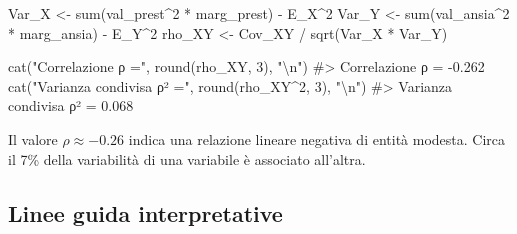 \documentclass[
  italian,
  letterpaper,
  a4paper,
  11pt,
  open=any]{scrbook}
\newenvironment{Shaded}{\begin{snugshade}}{\end{snugshade}}
\newcommand{\CommentTok}[1]{\textcolor[rgb]{0.37,0.37,0.37}{#1}}
\newcommand{\DecValTok}[1]{\textcolor[rgb]{0.68,0.00,0.00}{#1}}
\newcommand{\FunctionTok}[1]{\textcolor[rgb]{0.28,0.35,0.67}{#1}}
\newcommand{\NormalTok}[1]{\textcolor[rgb]{0.00,0.23,0.31}{#1}}
\newcommand{\OtherTok}[1]{\textcolor[rgb]{0.00,0.23,0.31}{#1}}
\newcommand{\SpecialCharTok}[1]{\textcolor[rgb]{0.37,0.37,0.37}{#1}}
\newcommand{\StringTok}[1]{\textcolor[rgb]{0.13,0.47,0.30}{#1}}
\theoremstyle{plain}
\theoremstyle{definition}
\theoremstyle{definition}
\theoremstyle{remark}
\begin{document}
\begin{tcolorbox}[enhanced jigsaw, arc=.35mm, bottomrule=.15mm, bottomtitle=1mm, breakable, colback=white, colbacktitle=quarto-callout-note-color!10!white, colframe=quarto-callout-note-color-frame, coltitle=black, left=2mm, leftrule=.75mm, opacityback=0, opacitybacktitle=0.6, rightrule=.15mm, title=\textcolor{quarto-callout-note-color}{\faInfo}\hspace{0.5em}{Esempio: correlazione ansia-prestazione}, titlerule=0mm, toprule=.15mm, toptitle=1mm]

\begin{Shaded}
\begin{Highlighting}[]
\NormalTok{Var\_X }\OtherTok{\textless{}{-}} \FunctionTok{sum}\NormalTok{(val\_prest}\SpecialCharTok{\^{}}\DecValTok{2} \SpecialCharTok{*}\NormalTok{ marg\_prest) }\SpecialCharTok{{-}}\NormalTok{ E\_X}\SpecialCharTok{\^{}}\DecValTok{2}
\NormalTok{Var\_Y }\OtherTok{\textless{}{-}} \FunctionTok{sum}\NormalTok{(val\_ansia}\SpecialCharTok{\^{}}\DecValTok{2} \SpecialCharTok{*}\NormalTok{ marg\_ansia) }\SpecialCharTok{{-}}\NormalTok{ E\_Y}\SpecialCharTok{\^{}}\DecValTok{2}
\NormalTok{rho\_XY }\OtherTok{\textless{}{-}}\NormalTok{ Cov\_XY }\SpecialCharTok{/} \FunctionTok{sqrt}\NormalTok{(Var\_X }\SpecialCharTok{*}\NormalTok{ Var\_Y)}

\FunctionTok{cat}\NormalTok{(}\StringTok{"Correlazione ρ ="}\NormalTok{, }\FunctionTok{round}\NormalTok{(rho\_XY, }\DecValTok{3}\NormalTok{), }\StringTok{"}\SpecialCharTok{\textbackslash{}n}\StringTok{"}\NormalTok{)}
\CommentTok{\#\textgreater{} Correlazione ρ = {-}0.262}
\FunctionTok{cat}\NormalTok{(}\StringTok{"Varianza condivisa ρ² ="}\NormalTok{, }\FunctionTok{round}\NormalTok{(rho\_XY}\SpecialCharTok{\^{}}\DecValTok{2}\NormalTok{, }\DecValTok{3}\NormalTok{), }\StringTok{"}\SpecialCharTok{\textbackslash{}n}\StringTok{"}\NormalTok{)}
\CommentTok{\#\textgreater{} Varianza condivisa ρ² = 0.068}
\end{Highlighting}
\end{Shaded}

Il valore \(\rho \approx -0.26\) indica una relazione lineare negativa
di entità modesta. Circa il 7\% della variabilità di una variabile è
associato all'altra.

\end{tcolorbox}

\subsection{Linee guida
interpretative}\label{linee-guida-interpretative}
\end{document}
